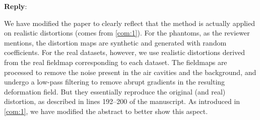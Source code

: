 \documentclass[9pt]{memoir}
\newcommand{\reply}{\par\fontshape{n}\selectfont \noindent \textbf{Reply}:\ }
\begin{document}
\reply{%
We have modified the paper to clearly reflect that the method is actually applied
  on realistic distortions (comes from \autoref{com:1}).
For the phantoms, as the reviewer mentions, the distortion maps are synthetic and
  generated with random coefficients.
For the real datasets, however, we use realistic distortions derived from the real fieldmap
  corresponding to each dataset.
The fieldmaps are processed to remove the noise present in the air cavities and the background,
  and undergo a low-pass filtering to remove abrupt gradients in the resulting deformation
  field.
But they essentially reproduce the original (and real) distortion, as described in lines 192--200
  of the manuscript.
As introduced in \autoref{com:1}, we have modified the abstract to better show this aspect.

\bigskip

}
\end{document}
